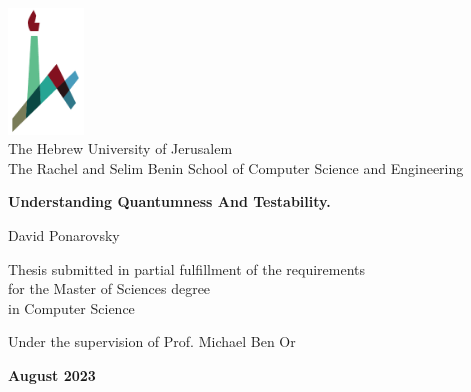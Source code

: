\documentclass[11pt, oneside]{book}
\begin{document}

\begin{titlepage}
    \begin{center}
        \vspace*{1cm}
        
        \includegraphics[width=0.15\textwidth]{huji_logo_notext.pdf}\\
        { \large The Hebrew University of Jerusalem\\
        The Rachel and Selim Benin School of Computer Science and Engineering }
        
        \vspace{2cm}
        
        {\huge \textbf{Understanding Quantumness And Testability.}}
        
        \vspace{1cm}
        
        \vspace{1.5cm}
        
        { \large David Ponarovsky }
        
        \vspace{1cm}
        
        { \large Thesis submitted in partial fulfillment of the requirements\\for the Master of Sciences degree\\
        in Computer Science } 
        
        \vspace{1cm}
        
        { \large  Under the supervision of Prof. Michael Ben Or }

        
        \vfill
        
        {\large \textbf{August 2023} }
    \end{center}
\end{titlepage}




%

\tableofcontents
\listoffigures
\setlength{\parindent}{0pt}
\setlength{\parskip}{5pt}
% 








\printbibliography[heading=bibliography]
\end{document}
